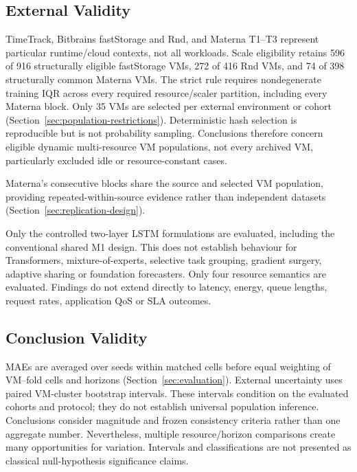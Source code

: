 \documentclass[a4paper,fleqn]{cas-dc}
\begin{document}
\subsection{External Validity}
\label{sec:threats-external}

TimeTrack, Bitbrains fastStorage and Rnd, and Materna T1--T3 represent
particular runtime/cloud contexts, not all workloads. Scale eligibility
retains 596 of 916 structurally eligible fastStorage VMs, 272 of 416 Rnd VMs,
and 74 of 398 structurally common Materna VMs. The strict rule requires
nondegenerate training IQR across every required resource/scaler partition,
including every Materna block. Only 35 VMs are selected per external
environment or cohort (Section~\ref{sec:population-restrictions}).
Deterministic hash selection is reproducible but is not probability sampling.
Conclusions therefore concern eligible dynamic multi-resource VM populations,
not every archived VM, particularly excluded idle or resource-constant cases.

Materna's consecutive blocks share the source and selected VM population,
providing repeated-within-source evidence rather than independent datasets
(Section~\ref{sec:replication-design}).

Only the controlled two-layer LSTM formulations are evaluated, including the
conventional shared M1 design. This does not establish
behaviour for Transformers, mixture-of-experts, selective task grouping,
gradient surgery, adaptive sharing or foundation forecasters. Only four
resource semantics are evaluated. Findings do not extend directly to latency,
energy, queue lengths, request rates, application QoS or SLA outcomes.

\subsection{Conclusion Validity}
\label{sec:threats-conclusion}

MAEs are averaged over seeds within matched cells
before equal weighting of VM--fold cells and horizons
(Section~\ref{sec:evaluation}). External uncertainty uses paired VM-cluster
bootstrap intervals. These intervals condition on the evaluated cohorts and
protocol; they do not establish universal population inference.
Conclusions consider magnitude and frozen consistency criteria rather than
one aggregate number. Nevertheless, multiple resource/horizon comparisons
create many opportunities for variation. Intervals and classifications are
not presented as classical null-hypothesis significance claims.
\end{document}
